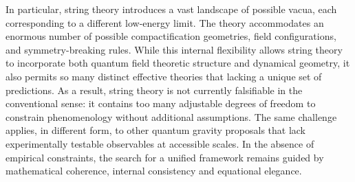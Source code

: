In particular, string theory introduces a vast landscape of possible vacua, each corresponding to a different low-energy limit. The theory accommodates an enormous number of possible compactification geometries, field configurations, and symmetry-breaking rules. While this internal flexibility allows string theory to incorporate both quantum field theoretic structure and dynamical geometry, it also permits so many distinct effective theories that lacking a unique set of predictions. As a result, string theory is not currently falsifiable in the conventional sense: it contains too many adjustable degrees of freedom to constrain phenomenology without additional assumptions. The same challenge applies, in different form, to other quantum gravity proposals that lack experimentally testable observables at accessible scales. In the absence of empirical constraints, the search for a unified framework remains guided by mathematical coherence, internal consistency and equational elegance.

